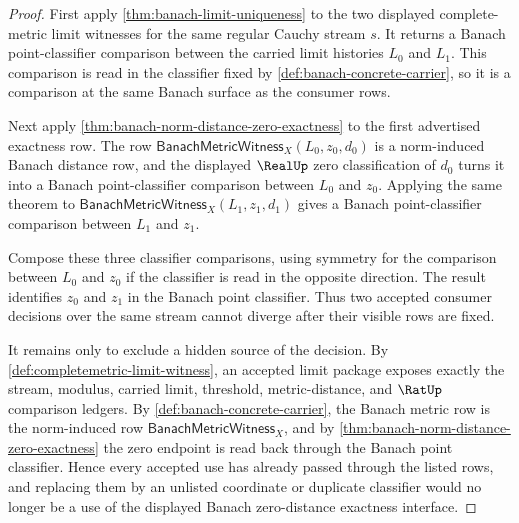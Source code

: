 \begin{proof}
First apply \autoref{thm:banach-limit-uniqueness} to the two displayed
complete-metric limit witnesses for the same regular Cauchy stream $s$. It
returns a Banach point-classifier comparison between the carried limit
histories $L_0$ and $L_1$. This comparison is read in the classifier fixed
by \autoref{def:banach-concrete-carrier}, so it is a comparison at the same
Banach surface as the consumer rows.

Next apply \autoref{thm:banach-norm-distance-zero-exactness} to the first
advertised exactness row. The row
$\mathsf{BanachMetricWitness}_X(L_0,z_0,d_0)$ is a norm-induced Banach
distance row, and the displayed $\RealUp$ zero classification of $d_0$ turns it
into a Banach point-classifier comparison between $L_0$ and $z_0$. Applying
the same theorem to
$\mathsf{BanachMetricWitness}_X(L_1,z_1,d_1)$ gives a Banach
point-classifier comparison between $L_1$ and $z_1$.

Compose these three classifier comparisons, using symmetry for the comparison
between $L_0$ and $z_0$ if the classifier is read in the opposite direction.
The result identifies $z_0$ and $z_1$ in the Banach point classifier. Thus two
accepted consumer decisions over the same stream cannot diverge after their
visible rows are fixed.

It remains only to exclude a hidden source of the decision. By
\autoref{def:completemetric-limit-witness}, an accepted limit package exposes
exactly the stream, modulus, carried limit, threshold, metric-distance, and
$\RatUp$ comparison ledgers. By \autoref{def:banach-concrete-carrier}, the
Banach metric row is the norm-induced row
$\mathsf{BanachMetricWitness}_X$, and by
\autoref{thm:banach-norm-distance-zero-exactness} the zero endpoint is read
back through the Banach point classifier. Hence every accepted use has already
passed through the listed rows, and replacing them by an unlisted coordinate or
duplicate classifier would no longer be a use of the displayed Banach
zero-distance exactness interface.
\end{proof}
